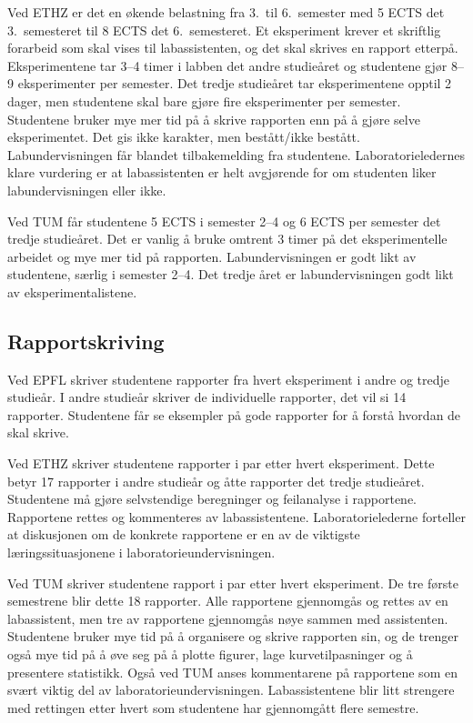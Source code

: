 \documentclass{article}
\begin{document}
Ved ETHZ er det en økende belastning fra 3.~til 6.~semester med 5 ECTS det 3.~semesteret til 8 ECTS det 6.~semesteret. Et eksperiment krever et skriftlig forarbeid som skal vises til labassistenten, og det skal skrives en rapport etterpå. Eksperimentene tar 3--4 timer i labben det andre studieåret og studentene gjør 8--9 eksperimenter per semester. Det tredje studieåret tar eksperimentene opptil 2 dager, men studentene skal bare gjøre fire eksperimenter per semester. Studentene bruker mye mer tid på å skrive rapporten enn på å gjøre selve eksperimentet.
Det gis ikke karakter, men bestått/ikke bestått. Labundervisningen får blandet tilbakemelding fra studentene. Laboratorieledernes klare vurdering er at labassistenten er helt avgjørende for om studenten liker labundervisningen eller ikke.

Ved TUM får studentene 5 ECTS i semester 2--4 og 6 ECTS per semester det tredje studieåret. Det er vanlig å bruke omtrent 3 timer på det eksperimentelle arbeidet og mye mer tid på rapporten. Labundervisningen er godt likt av studentene, særlig i semester 2--4. Det tredje året er labundervisningen godt likt av eksperimentalistene.

\subsection{Rapportskriving}
Ved EPFL skriver studentene rapporter fra hvert eksperiment i andre og tredje studieår. I andre studieår skriver de individuelle rapporter, det vil si 14 rapporter. Studentene får se eksempler på gode rapporter for å forstå hvordan de skal skrive.

Ved ETHZ skriver studentene rapporter i par etter hvert eksperiment. Dette betyr 17 rapporter i andre studieår og åtte rapporter det tredje studieåret. Studentene må gjøre selvstendige beregninger og feilanalyse i rapportene. Rapportene rettes og kommenteres av labassistentene. Laboratorielederne forteller at diskusjonen om de konkrete rapportene er en av de viktigste læringssituasjonene i laboratorieundervisningen.

Ved TUM skriver studentene rapport i par etter hvert eksperiment. De tre første semestrene blir dette 18 rapporter. Alle rapportene gjennomgås og rettes av en labassistent, men tre av rapportene gjennomgås nøye sammen med assistenten. Studentene bruker mye tid på å organisere og skrive rapporten sin, og de trenger også mye tid på å øve seg på å plotte figurer, lage kurvetilpasninger og å presentere statistikk. Også ved TUM anses kommentarene på rapportene som en svært viktig del av laboratorieundervisningen. Labassistentene blir litt strengere med rettingen etter hvert som studentene har gjennomgått flere semestre.
\end{document}
